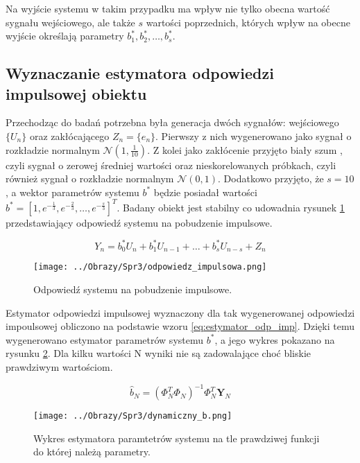 \documentclass[12pt,a4paper]{article}
\begin{document}
Na wyjście systemu w takim przypadku ma wpływ nie tylko obecna wartość sygnału wejściowego, ale także $s$ wartości poprzednich, których wpływ na obecne wyjście określają parametry $b_{1}^{*},b_{2}^{*},\dots,b_{s}^{*}$.

\subsection{Wyznaczanie estymatora odpowiedzi impulsowej obiektu}
Przechodząc do badań potrzebna była generacja dwóch sygnałów: wejściowego $\{U_{n}\}$ oraz zakłócającego $Z_{n}=\{e_{n}\}$. Pierwszy z nich wygenerowano jako sygnał o rozkładzie normalnym $\mathcal{N}(1,\frac{1}{10})$. Z kolei jako zakłócenie przyjęto biały szum , czyli sygnał o zerowej średniej wartości oraz nieskorelowanych próbkach, czyli również sygnał o rozkładzie normalnym $\mathcal{N}(0,1)$.
Dodatkowo przyjęto, że $s=10$, a wektor parametrów systemu $b^{*}$ będzie posiadał wartości $b^{*}=[1,e^{-\frac{1}{3}},e^{-\frac{2}{3}},\dots,e^{-\frac{s}{3}}]^{T}$.
Badany obiekt jest stabilny co udowadnia rysunek \ref{fig:dynamiczny_odp} przedstawiający odpowiedź systemu na pobudzenie impulsowe.

\begin{equation}\label{eq:dynamiczny}
Y_{n} = b_{0}^{*}U_{n} + b_{1}^{*}U_{n-1} + \dots + b_{s}^{*}U_{n-s} + Z_{n}
\end{equation}

\begin{figure}[H]
\centering
\texttt{[image: ../Obrazy/Spr3/odpowiedz\_impulsowa.png]} 
\caption{Odpowiedź systemu na pobudzenie impulsowe.}
\label{fig:dynamiczny_odp}
\end{figure}

Estymator odpowiedzi impulsowej wyznaczony dla tak wygenerowanej odpowiedzi impoulsowej obliczono na podstawie wzoru \ref{eq:estymator_odp_imp}.
Dzięki temu wygenerowano estymator parametrów systemu $b^{*}$, a jego wykres pokazano na rysunku \ref{fig:estymator_b}.
Dla kilku wartości N wyniki nie są zadowalające choć bliskie prawdziwym wartościom.

\begin{equation}\label{eq:estymator_odp_imp}
\hat{b}_{N}=(\Phi_{N}^{T}\Phi_{N})^{-1}\Phi_{N}^{T}\boldsymbol{Y}_{N}
\end{equation}

\begin{figure}[H]
\centering
\texttt{[image: ../Obrazy/Spr3/dynamiczny\_b.png]} 
\caption{Wykres estymatora paramtetrów systemu na tle prawdziwej funkcji do której należą parametry.}
\label{fig:estymator_b}
\end{figure}
\end{document}
